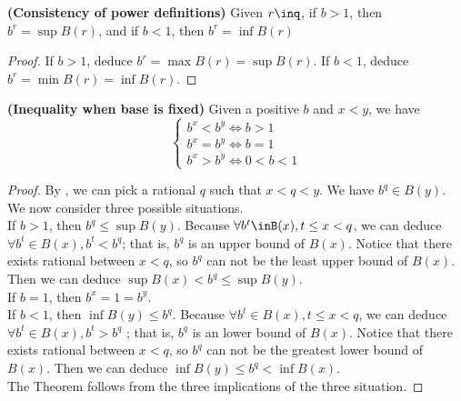 \documentclass{report}
\begin{document}
\begin{theorem}
\label{1.4.3}
  \textbf{(Consistency of power definitions)} Given $r\inq$, if $b>1$, then  $b^r=\sup B(r)$, and if $b<1$, then  $b^r=\inf B(r)$
\end{theorem}
\begin{proof}
If $b>1$, deduce  $b^r=\max  B(r)=\sup B(r)$. If $b<1$, deduce $b^r=\min B(r)=\inf B(r)$.  
\end{proof}


\begin{theorem}
\label{1.4.4}
\textbf{(Inequality when base is fixed)} Given a positive $b$ and $x<y$, we have
 \begin{equation*}
\begin{cases}
  b^x<b^y\iff b>1\\
  b^x=b^y\iff b=1\\
  b^x>b^y\iff 0<b<1
\end{cases}
\end{equation*}
\end{theorem}
\begin{proof}
  By , we can pick a rational $q$ such that  $x<q<y$. We have $b^q\in B(y)$. We now consider three possible situations.\\



  If $b>1$, then $b^q\leq \sup B(y)$. Because $\forall b^t\inB(x), t\leq x<q$, we can  deduce $\forall b^t\in B(x), b^t<b^q$; that is, $b^q$ is an upper bound of $B(x)$. Notice that there exists rational between $x<q$, so  $b^q$ can not be the least upper bound of  $B(x)$.  Then we can deduce $\sup B(x)< b^q\leq \sup B(y)$.\\

  If $b=1$, then  $b^x=1=b^y$.\\

  If  $b<1$, then $\inf B(y)\leq b^q$. Because $\forall b^t\in B(x), t\leq x<q$, we can deduce $\forall b^t\in B(x), b^t>b^q$ ; that is, $b^q$ is an lower bound of  $B(x)$. Notice that there exists rational between $x<q$, so  $b^q$ can not be the greatest lower bound of  $B(x)$. Then we can deduce $\inf B(y)\leq b^q< \inf B(x)$.\\

  The Theorem follows from the three implications of the three situation. 
\end{proof}
\end{document}

